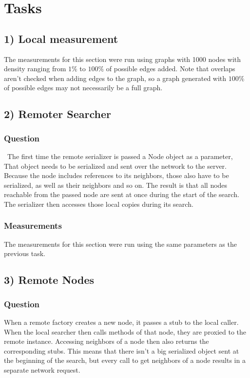 \documentclass{scrartcl}
\begin{document}
    \section*{Tasks}
    \subsection*{1) Local measurement}
    The measurements for this section were run using graphs with 1000 nodes with density ranging from $1\%$ to $100\%$ of possible edges added. Note that overlaps aren't checked when adding edges to the graph, so a graph generated with $100\%$ of possible edges may not necessarily be a full graph.
    \subsection*{2) Remoter Searcher}
    \subsubsection*{Question} \
    The first time the remote serializer is passed a Node object as a parameter, That object needs to be serialized and sent over the network to the server. Because the node includes references to its neighbors, those also have to be serialized, as well as their neighbors and so on. The result is that all nodes reachable from the passed node are sent at once during the start of the search. The serializer then accesses those local copies during its search.

    \subsubsection*{Measurements}
    The measurements for this section were run using the same parameters as the previous task.
    \subsection*{3) Remote Nodes}
    \subsubsection*{Question}
    When a remote factory creates a new node, it passes a stub to the local caller. When the local searcher then calls methods of that node, they are proxied to the remote instance. Accessing neighbors of a node then also returns the corresponding stubs. This means that there isn't a big serialized object sent at the beginning of the search, but every call to get neighbors of a node results in a separate network request.
\end{document}
